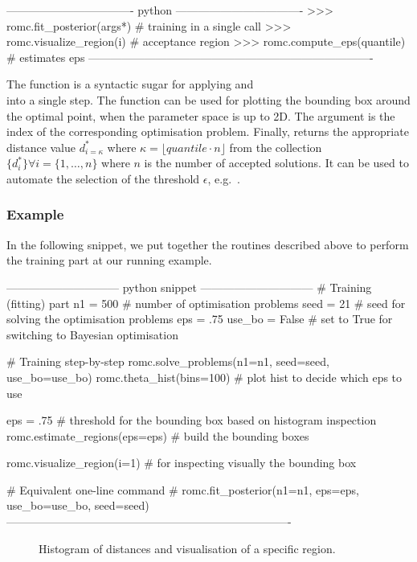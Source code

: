 \begin{Code}
---------------------------------- python ----------------------------------
>>> romc.fit_posterior(args*)  # training in a single call
>>> romc.visualize_region(i)   # acceptance region
>>> romc.compute_eps(quantile) # estimates eps
----------------------------------------------------------------------------
\end{Code}

\noindent
The function  is a syntactic sugar for applying
 and \\  into a single
step. The function  can be used for plotting
the bounding box around the optimal point, when the parameter space is
up to 2D. The argument  is the index of the corresponding
optimisation problem. Finally,  returns the
appropriate distance value \(d_{i=\kappa}^*\) where
\(\kappa = \lfloor quantile \cdot n \rfloor\) from the collection
\(\{ d_i^* \} \forall i = \{1, \ldots, n\}\) where \(n\) is the number
of accepted solutions. It can be used to automate the selection of the
threshold \(\epsilon\), e.g.\
.


\subsubsection*{Example}


In the following snippet, we put together the routines described above
to perform the training part at our running example.

\begin{Code}
------------------------------ python snippet ------------------------------
  # Training (fitting) part
  n1 = 500 # number of optimisation problems
  seed = 21 # seed for solving the optimisation problems
  eps = .75 
  use_bo = False # set to True for switching to Bayesian optimisation

  # Training step-by-step
  romc.solve_problems(n1=n1, seed=seed, use_bo=use_bo)
  romc.theta_hist(bins=100) # plot hist to decide which eps to use

  eps = .75 # threshold for the bounding box based on histogram inspection
  romc.estimate_regions(eps=eps) # build the bounding boxes

  romc.visualize_region(i=1) # for inspecting visually the bounding box

  # Equivalent one-line command
  # romc.fit_posterior(n1=n1, eps=eps, use_bo=use_bo, seed=seed)
----------------------------------------------------------------------------  
\end{Code}

\begin{figure}[ht]
  \begin{center}    
    
    
  \end{center}
  \caption[Histogram of distances at the one-dimensional example.]{Histogram of
    distances and visualisation of a specific region.}
  \label{fig:running_example_romc_inference}
\end{figure}
